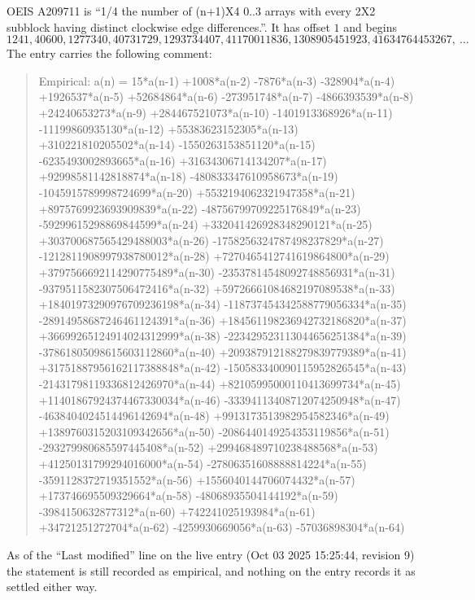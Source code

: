 \documentclass[11pt,a4paper]{article}
\theoremstyle{plain}
\theoremstyle{definition}
\begin{document}
OEIS A209711 is ``1/4 the number of (n+1)X4 0..3 arrays with every 2X2 subblock having distinct clockwise edge differences.''. It has offset $1$ and begins
\[
1241, 40600, 1277340, 40731729, 1293734407, 41170011836, 1308905451923, 41634764453267,\ \dots
\]
The entry carries the following comment:
\begin{quote}\small
Empirical: a(n) = 15*a(n-1) +1008*a(n-2) -7876*a(n-3) -328904*a(n-4) +1926537*a(n-5) +52684864*a(n-6) -273951748*a(n-7) -4866393539*a(n-8) +24240653273*a(n-9) +284467521073*a(n-10) -1401913368926*a(n-11) -11199860935130*a(n-12) +55383623152305*a(n-13) +310221810205502*a(n-14) -1550263153851120*a(n-15) -6235493002893665*a(n-16) +31634306714134207*a(n-17) +92998581142818874*a(n-18) -480833347610958673*a(n-19) -1045915789998724699*a(n-20) +5532194062321947358*a(n-21) +8975769923693909839*a(n-22) -48756799709225176849*a(n-23) -59299615298869844599*a(n-24) +332041426928348290121*a(n-25) +303700687565429488003*a(n-26) -1758256324787498237829*a(n-27) -1212811908997938780012*a(n-28) +7270465412741619864800*a(n-29) +3797566692114290775489*a(n-30) -23537814548092748856931*a(n-31) -9379511582307506472416*a(n-32) +59726661084682197089538*a(n-33) +18401973290976709236198*a(n-34) -118737454342588779056334*a(n-35) -28914958687246461124391*a(n-36) +184561198236942732186820*a(n-37) +36699265124914024312999*a(n-38) -223429523113044656251384*a(n-39) -37861805098615603112860*a(n-40) +209387912188279839779389*a(n-41) +31751887956162117388848*a(n-42) -150583340090115952826545*a(n-43) -21431798119336812426970*a(n-44) +82105995000110413699734*a(n-45) +11401867924374467330034*a(n-46) -33394113408712074250948*a(n-47) -4638404024514496142694*a(n-48) +9913173513982954582346*a(n-49) +1389760315203109342656*a(n-50) -2086440149254353119856*a(n-51) -293279980685597445408*a(n-52) +299468489710238488568*a(n-53) +41250131799294016000*a(n-54) -27806351608888814224*a(n-55) -3591128372719351552*a(n-56) +1556040144706074432*a(n-57) +173746695509329664*a(n-58) -48068935504144192*a(n-59) -3984150632877312*a(n-60) +742241025193984*a(n-61) +34721251272704*a(n-62) -4259930669056*a(n-63) -57036898304*a(n-64)
\end{quote}
As of the ``Last modified'' line on the live entry (Oct 03 2025 15:25:44, revision 9) the statement is
still recorded as empirical, and nothing on the entry records it as settled either way.
\end{document}
